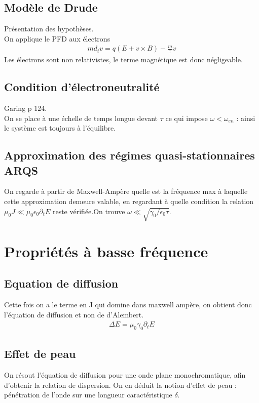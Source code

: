 \documentclass[12pt,prb,aps,epsf]{article}
\begin{document}
\subsection{Modèle de Drude}
Présentation des hypothèses.\\
On applique le PFD aux électrons
\begin{eqnarray}
m d_tv = q (E+v\times B) - \frac{m}{\tau}v
\end{eqnarray}
Les électrons sont non relativistes, le terme magnétique est donc négligeable.

\subsection{Condition d'électroneutralité}
Garing p 124.\\
On se place à une échelle de temps longue devant $\tau$ ce qui impose $\omega < \omega_{en}$ : ainsi le système est toujours à l'équilibre.

\subsection{Approximation des régimes quasi-stationnaires ARQS}
On regarde à partir de Maxwell-Ampère quelle est la fréquence max à laquelle cette approximation demeure valable, en regardant à quelle condition la relation $\mu_0 J \ll \mu_0\epsilon_0\partial_tE$ reste vérifiée.On trouve $\omega \ll \sqrt{\gamma_0/\epsilon_0\tau}$.

\section{Propriétés à basse fréquence}
\subsection{Equation de diffusion}
Cette fois on a le terme en J qui domine dans maxwell ampère, on obtient donc l'équation de diffusion et non de d'Alembert.
\begin{eqnarray}
\Delta E = \mu_0 \gamma_0 \partial_t E
\end{eqnarray}
\subsection{Effet de peau}
On résout l'équation de diffusion pour une onde plane monochromatique, afin d'obtenir la relation de dispersion. On en déduit la notion d'effet de peau : pénétration de l'onde sur une longueur caractéristique $\delta$.
\end{document}
